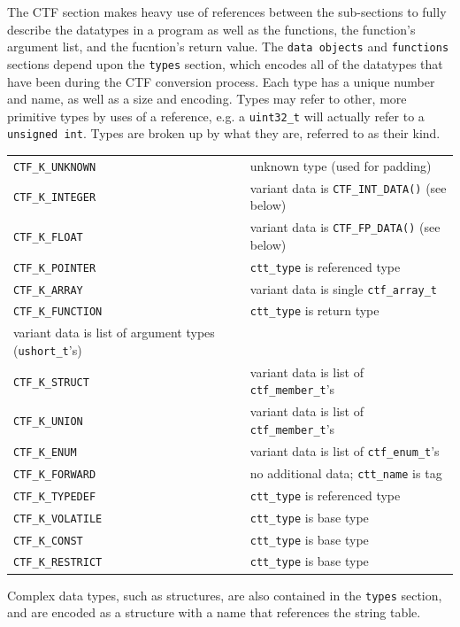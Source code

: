The CTF section makes heavy use of references between the sub-sections
to fully describe the datatypes in a program as well as the functions,
the function's argument list, and the fucntion's return value.  The
\verb|data objects| and \verb|functions| sections depend upon the
\verb|types| section, which encodes all of the datatypes that have
been during the CTF conversion process.  Each type has a unique number
and name, as well as a size and encoding.  Types may refer to other,
more primitive types by uses of a reference, e.g. a \verb|uint32_t|
will actually refer to a \verb|unsigned int|.  Types are broken up by
what they are, referred to as their kind.


\begin{tabular}{|l|l}
\hline
\verb|CTF_K_UNKNOWN| & unknown type (used for padding)\\
\verb|CTF_K_INTEGER| & variant data is \verb|CTF_INT_DATA()| (see below)\\
\verb|CTF_K_FLOAT| & variant data is \verb|CTF_FP_DATA()| (see below)\\
\verb|CTF_K_POINTER| & \verb|ctt_type| is referenced type\\
\verb|CTF_K_ARRAY| & variant data is single \verb|ctf_array_t|\\
  \verb|CTF_K_FUNCTION| & \verb|ctt_type| is return type\\
  variant data is list of argument types (\verb|ushort_t|'s)\\
\verb|CTF_K_STRUCT| & variant data is list of \verb|ctf_member_t|'s\\
\verb|CTF_K_UNION| & variant data is list of \verb|ctf_member_t|'s\\
\verb|CTF_K_ENUM| & variant data is list of \verb|ctf_enum_t|'s\\
\verb|CTF_K_FORWARD| & no additional data; \verb|ctt_name| is tag\\
\verb|CTF_K_TYPEDEF| & \verb|ctt_type| is referenced type\\
\verb|CTF_K_VOLATILE| & \verb|ctt_type| is base type\\
\verb|CTF_K_CONST| & \verb|ctt_type| is base type\\
\verb|CTF_K_RESTRICT| & \verb|ctt_type| is base type\\
\hline
\end{tabular}

Complex data types, such as structures, are also contained in the
\verb|types| section, and are encoded as a structure with a name that
references the string table.

